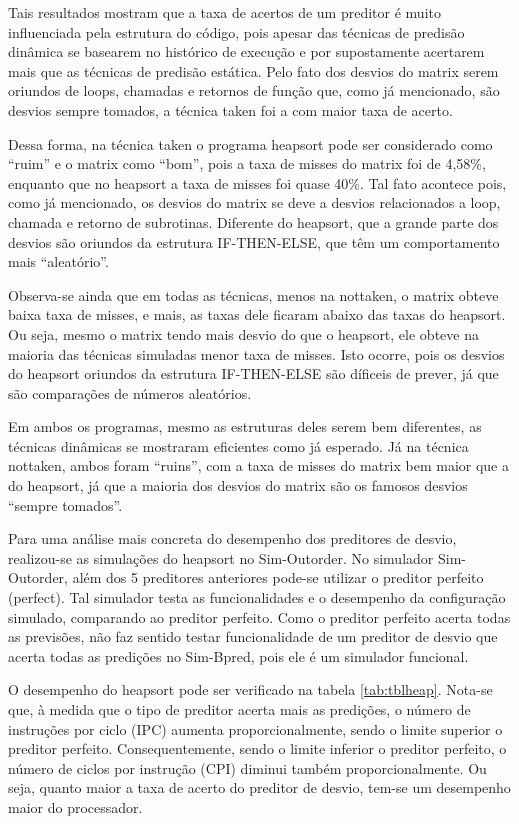 \documentclass[12pt]{article}
\begin{document}
Tais resultados mostram que a taxa de acertos de um preditor é muito influenciada pela estrutura do código, pois apesar das técnicas de predisão dinâmica se
basearem no histórico de execução e por supostamente acertarem mais que as técnicas de predisão estática.
Pelo fato dos desvios do matrix serem oriundos de loops, chamadas e retornos de função que, como já mencionado, são desvios sempre tomados, a técnica taken foi a com maior taxa de acerto.

Dessa forma, na técnica taken o programa heapsort pode ser considerado como ``ruim'' e o matrix como ``bom'', pois a taxa de misses do matrix foi de 4,58\%,
enquanto que no heapsort a taxa de misses foi quase 40\%. Tal fato acontece pois, como já mencionado, os desvios do matrix se deve a desvios relacionados a
loop, chamada e retorno de subrotinas. Diferente do heapsort, que a grande parte dos desvios são oriundos da estrutura IF-THEN-ELSE, que têm um comportamento
mais ``aleatório''.

Observa-se ainda que em todas as técnicas, menos na nottaken, o matrix obteve baixa taxa de misses, e mais, as taxas dele ficaram abaixo das taxas do heapsort.
Ou seja, mesmo o matrix tendo mais desvio do que o heapsort, ele obteve na maioria das técnicas simuladas menor taxa de misses. Isto ocorre, pois os desvios do heapsort oriundos da estrutura IF-THEN-ELSE são díficeis de prever, já que são comparações de números aleatórios.

Em ambos os programas, mesmo as estruturas deles serem bem diferentes, as técnicas dinâmicas se mostraram eficientes como já esperado. Já na técnica nottaken, ambos foram ``ruins'', com a taxa de misses do matrix bem maior que a do heapsort, já que a maioria dos desvios do matrix são os famosos desvios ``sempre tomados''.

Para uma análise mais concreta do desempenho dos preditores de desvio, realizou-se as simulações do heapsort no Sim-Outorder.  No simulador Sim-Outorder, além dos 5 preditores anteriores pode-se utilizar o preditor perfeito (perfect). Tal simulador testa as funcionalidades e o desempenho da configuração simulado, comparando ao preditor perfeito. Como o preditor perfeito acerta todas as previsões, não faz sentido testar funcionalidade de um preditor de desvio que acerta todas as predições no Sim-Bpred, pois ele é um simulador funcional.

O desempenho do heapsort pode ser verificado na tabela \ref{tab:tblheap}. Nota-se que, à medida que o tipo de preditor acerta mais as predições, o número de
instruções por ciclo (IPC) aumenta proporcionalmente, sendo o limite superior o preditor perfeito. Consequentemente, sendo o limite inferior o preditor perfeito,  o número de ciclos por instrução (CPI) diminui também proporcionalmente. Ou seja, quanto maior a taxa de acerto do preditor de desvio, tem-se um desempenho maior do processador.
\end{document}
